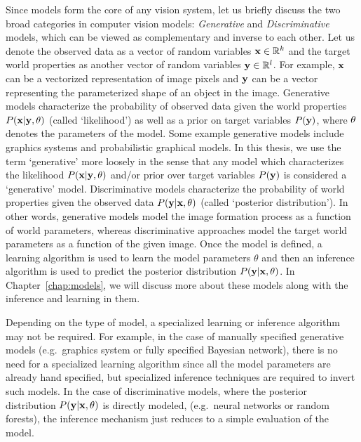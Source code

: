Since models form the core of any vision system, let us briefly discuss the
two broad categories in computer vision models:
\textit{Generative} and \textit{Discriminative}
models, which can be viewed as complementary and inverse to each other.
Let us denote the observed data as a vector of random variables $\mathbf{x} \in \mathbb{R}^k$ and
the target world properties as another vector of random variables $\mathbf{y} \in \mathbb{R}^l$.
For example, $\mathbf{x}$ can be a vectorized representation of image pixels and
$\mathbf{y}$ can be a vector representing the parameterized shape of an object
in the image. Generative models characterize the probability of observed data
given the world properties $P(\mathbf{x}|\mathbf{y},\mathbf{\theta})$ (called `likelihood')
as well as a prior on target variables $P(\mathbf{y})$,
where $\mathbf{\theta}$ denotes the parameters of the model.
Some example generative models include graphics systems and probabilistic graphical models.
In this thesis, we use the
term `generative' more loosely in the sense that any model which characterizes
the likelihood $P(\mathbf{x}|\mathbf{y},\mathbf{\theta})$ and/or prior over target
variables $P(\mathbf{y})$ is considered a `generative' model.
Discriminative models characterize the probability of world properties
given the observed data $P(\mathbf{y}|\mathbf{x},\mathbf{\theta})$ (called `posterior distribution').
In other words, generative models model the image formation process as a function
of world parameters, whereas discriminative approaches model the target world
parameters as a function of the given image.
Once the model is defined, a learning algorithm is used to learn the model
parameters $\theta$ and then an inference algorithm is used to predict the
posterior distribution $P(\mathbf{y}|\mathbf{x},\mathbf{\theta})$. In Chapter~\ref{chap:models},
we will discuss more about these models along with the inference and learning in them.

Depending on the type of model, a specialized learning or inference algorithm
may not be required. For example, in the case of manually specified generative models
(e.g.\ graphics system or fully specified Bayesian network),
there is no need for a specialized learning
algorithm since all the model parameters are already hand specified,
but specialized inference techniques are required to invert such
models. In the case of discriminative models, where the
posterior distribution $P(\mathbf{y}|\mathbf{x},\mathbf{\theta})$ is directly modeled, (e.g.\ neural
networks or random forests), the inference mechanism just reduces to a simple
evaluation of the model.

